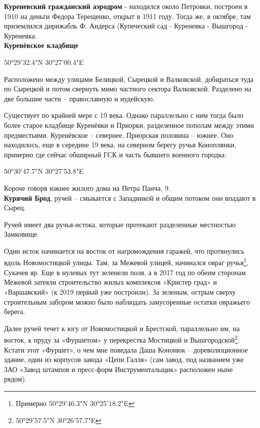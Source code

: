 \textbf{Куреневский гражданский аэродром} - находился около Петровки, построен в 1910 на деньги Федора Терещенко, открыт в 1911 году. Тогда же, в октябре, там приземлился дирижабль Ф. Андерса (Купеческий сад - Куреневка - Вышгород - Куреневка.\\ 

\textbf{Куренёвское кладбище} 

50°29'32.4"N 30°27'00.4"E

Расположено между улицами Белицкой, Сырецкой и Валковской, добираться туда по Сырецкой и потом свернуть мимо частного сектора Валковской. Разделено на две большие части – православную и иудейскую. 

Существует по крайней мере с 19 века. Однако параллельно с ним тогда было более старое кладбище Куренёвки и Приорки, разделенное пополам между этими предместьями. Куренёвское – севернее, Приорская половина – южнее. Оно находилось, еще в середине 19 века, на северном берегу ручья Коноплянки, примерно где сейчас обширный ГСК и часть бывшего военного городка:

50°30'47.7"N 30°27'53.8"E

Короче говоря южнее жилого дома на Петра Панча, 9.\\

\textbf{Курячий Брод}, ручей – смыкается с Западинкой и общим потоком они впадают в Сырец.

Ручей имеет два ручья-истока, которые протекают разделенные местностью Замковище. 

Один исток начинается на восток от нагромождения гаражей, что протянулись вдоль Новомостицкой улицы. Там, за Межевой улицей, начинался овраг ручья\footnote{Примерно 50°29'46.3"N 30°25'18.2"E}, Сукачев яр. Еще в нулевых тут зеленели поля, а в 2017 год по обеим сторонам Межевой затеяли строительство жилых комплексов «Кристер град» и «Варшавский» (к 2019 первый уже построили). За зеленым, острым сверху строительным забором можно было наблюдать замусоренные остатки овражьего берега.

Далее ручей течет к югу от Новомостицкой и Брестской, параллельно им, на восток, к пруду за «Фуршетом» у перекрестка Мостицкой и Вышгородской\footnote{50°29'57.5"N 30°26'57.7"E}. Кстати этот «Фуршет», о чем мне поведала Даша Кононюк – дореволюционное здание, один из корпусов завода «Цепи Галля» (сам завод, под названием уже ЗАО «Завод штампов и пресс-форм Инструментальщик»  расположен ныне рядом).


